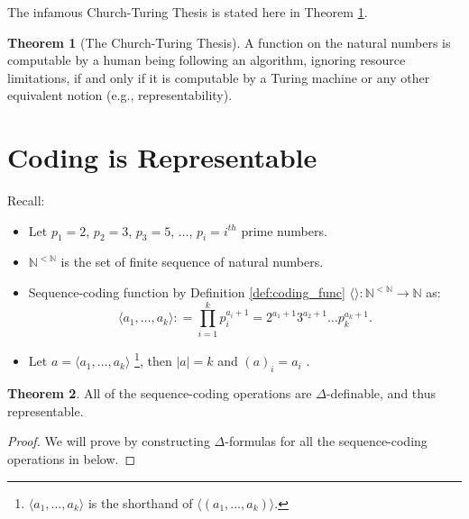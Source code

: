 \documentclass[11pt,letterpaper]{book}
\theoremstyle{definition}
\newtheorem{theorem}{Theorem}[section]
\begin{document}
The infamous Church-Turing Thesis is stated here in Theorem \ref{theorem:church_turing_thesis}.

\begin{theorem}[The Church-Turing Thesis]
\label{theorem:church_turing_thesis}
A function on the natural numbers is computable by a human being following an algorithm, ignoring resource limitations, if and only if it is computable by a Turing machine or any other equivalent notion
(e.g., representability).
\end{theorem}



\section{Coding is Representable}

Recall:

\begin{itemize}
\item{Let $p_1 = 2$, $p_2 = 3$, $p_3 = 5$, $\ldots$, $p_i = i^{th}$ prime numbers.}
\item{$\mathbb{N}^{< \mathbb{N}}$ is the set of finite sequence of natural numbers.}
\item{Sequence-coding function by Definition \ref{def:coding_func} $ \langle \rangle : \mathbb{N}^{< \mathbb{N}} \rightarrow \mathbb{N}$ as:
$$ \langle a_1, \ldots, a_k \rangle : = \prod_{i=1} ^{k} p_i ^{a_i + 1}    = 2^{a_1 + 1} 3^{a_2 +1} \ldots p_k
^{a_k + 1}.$$
}
\item{Let $a = \langle a_1, \ldots, a_k \rangle$ \footnote{ $\langle a_1, \ldots, a_k \rangle $ is the shorthand of $\langle ( a_1, \ldots, a_k ) \rangle$.}, then $|a| = k $ and $ (a)_i = a_i $ . }
\end{itemize}


\begin{theorem}
All of the sequence-coding operations are $\Delta$-definable, and thus representable.
\end{theorem}

\begin{proof}
We will prove by constructing $\Delta$-formulas for all the sequence-coding operations in below.
\end{proof}
\end{document}
